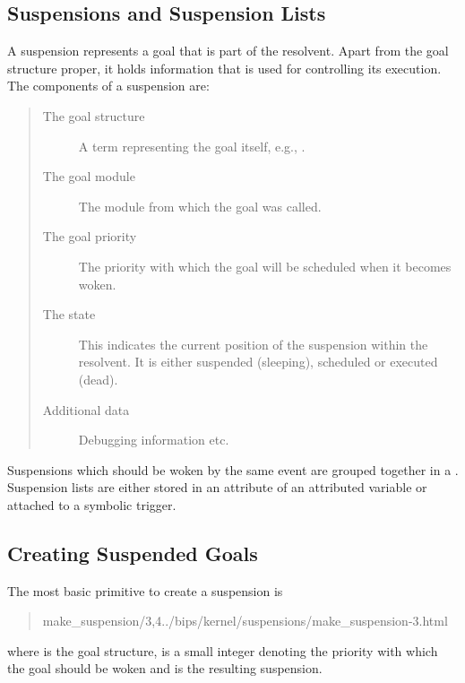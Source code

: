 
\subsection{Suspensions and Suspension Lists}
A suspension represents a goal that is part of the resolvent.
Apart from the goal structure proper, it holds information that
is used for controlling its execution.
The components of a suspension are:
\begin{quote}
\begin{description}
\item[The goal structure]
        A term representing the goal itself, e.g., .
\item[The goal module]
        The module from which the goal was called.
\item[The goal priority]
        The priority with which the goal will be scheduled when
        it becomes woken.
\item[The state]
        This indicates the current position of the suspension within
        the resolvent. It is either suspended (sleeping), scheduled
	or executed (dead).
\item[Additional data]
	Debugging information etc.
\end{description}
\end{quote}

Suspensions which should be woken by the same event are grouped
together in a .
Suspension lists are either stored in an attribute of
an attributed variable or attached to a symbolic trigger.


\subsection{Creating Suspended Goals}
The most basic primitive to create a suspension is
\begin{quote}
%
{make_suspension/3,4}{../bips/kernel/suspensions/make_suspension-3.html}%
\end{quote}
where  is the goal structure,
 is a small integer denoting the priority with which
the goal should be woken and  is the resulting suspension.

